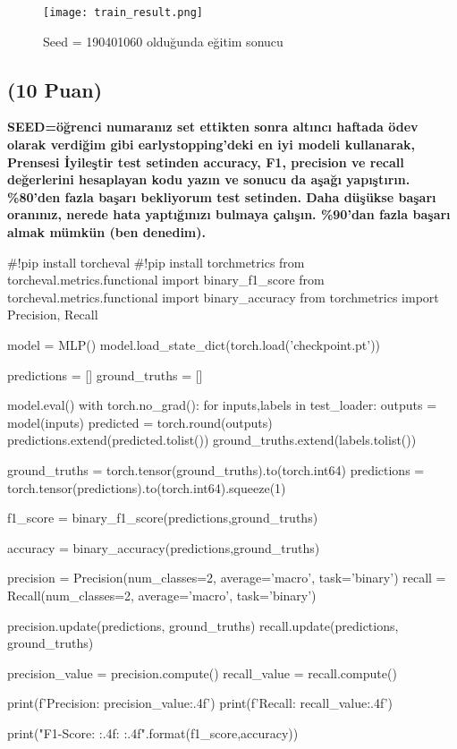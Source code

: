 \documentclass[11pt]{article}
\begin{document}
\begin{figure}[h]
  \centering
  \shorthandoff{=}
  \texttt{[image: train\_result.png]}
  \shorthandoff{=}
  \caption[Şekil 4]{Seed = 190401060 olduğunda eğitim sonucu}
\end{figure}
\newpage

\subsection{(10 Puan)} \textbf{SEED=öğrenci numaranız set ettikten sonra altıncı haftada ödev olarak verdiğim gibi earlystopping'deki en iyi modeli kullanarak, Prensesi İyileştir test setinden accuracy, F1, precision ve recall değerlerini hesaplayan kodu yazın ve sonucu da aşağı yapıştırın. \%80'den fazla başarı bekliyorum test setinden. Daha düşükse başarı oranınız, nerede hata yaptığınızı bulmaya çalışın. \%90'dan fazla başarı almak mümkün (ben denedim).}

\begin{python}
#!pip install torcheval
#!pip install torchmetrics
from torcheval.metrics.functional import binary_f1_score
from torcheval.metrics.functional import binary_accuracy
from torchmetrics import Precision, Recall

model = MLP()
model.load_state_dict(torch.load('checkpoint.pt'))

predictions = []
ground_truths = []

model.eval()
with torch.no_grad():
    for inputs,labels in test_loader:
        outputs = model(inputs)
        predicted = torch.round(outputs)
        predictions.extend(predicted.tolist())
        ground_truths.extend(labels.tolist())

ground_truths = torch.tensor(ground_truths).to(torch.int64)
predictions = torch.tensor(predictions).to(torch.int64).squeeze(1)


f1_score = binary_f1_score(predictions,ground_truths)

accuracy = binary_accuracy(predictions,ground_truths)

precision = Precision(num_classes=2, average='macro', task='binary')
recall = Recall(num_classes=2, average='macro', task='binary')

precision.update(predictions, ground_truths)
recall.update(predictions, ground_truths)

precision_value = precision.compute()
recall_value = recall.compute()

print(f'Precision: {precision_value:.4f}')
print(f'Recall: {recall_value:.4f}')

print("F1-Score: {:.4f}\nAccuracy: {:.4f}".format(f1_score,accuracy))
\end{python}
\end{document}
